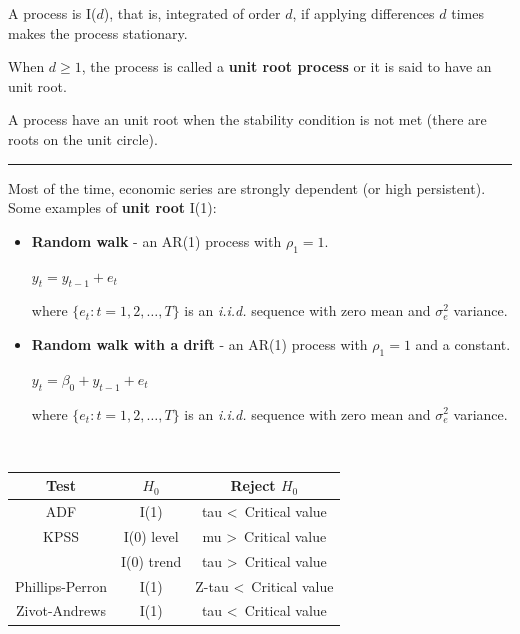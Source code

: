   \begin{f}

A process is I(\(d\)), that is, integrated of order \(d\), if applying differences \(d\) times makes the process stationary.

When \(d \geq 1\), the process is called a \textbf{unit root process} or it is said to have an unit root.

A process have an unit root when the stability condition is not met (there are roots on the unit circle).

\end{f}  \hrule  

\begin{f}

Most of the time, economic series are strongly dependent (or high persistent). Some examples of \textbf{unit root} I(1):

\begin{itemize}[leftmargin=*]
	\item \textbf{Random walk} - an AR(1) process with \(\rho_{1} = 1\).
	
	\begin{center}
		\(y_{t} = y_{t - 1} + e_{t}\)
	\end{center}
	
	where \(\lbrace e_{t}: t = 1, 2, \ldots, T \rbrace\) is an \textsl{i.i.d.} sequence with zero mean and \(\sigma^{2}_{e}\) variance.
	
	\item \textbf{Random walk with a drift} - an AR(1) process with \(\rho_{1} = 1\) and a constant.
	
	\begin{center}
		\(y_{t} = \beta_{0} + y_{t - 1} + e_{t}\)
	\end{center}
	
	where \(\lbrace e_{t}: t = 1, 2, \ldots, T \rbrace\) is an \textsl{i.i.d.} sequence with zero mean and \(\sigma^{2}_{e}\) variance.
\end{itemize}

\end{f} 

 \begin{f}{\ }

\begin{center}
	\begin{tabular}{ c | c | c }
		Test            & \(H_{0}\)    & Reject \(H_{0}\)                     \\ \hline
		ADF             & I(1)       & tau \textless \, Critical value    \\ \hline
		KPSS            & I(0) level & mu \textgreater \, Critical value  \\
		& I(0) trend & tau \textgreater \, Critical value \\ \hline
		Phillips-Perron & I(1)       & Z-tau \textless \, Critical value  \\ \hline
		Zivot-Andrews   & I(1)       & tau \textless \, Critical value
	\end{tabular}
\end{center}
\medskip

\end{f}  

